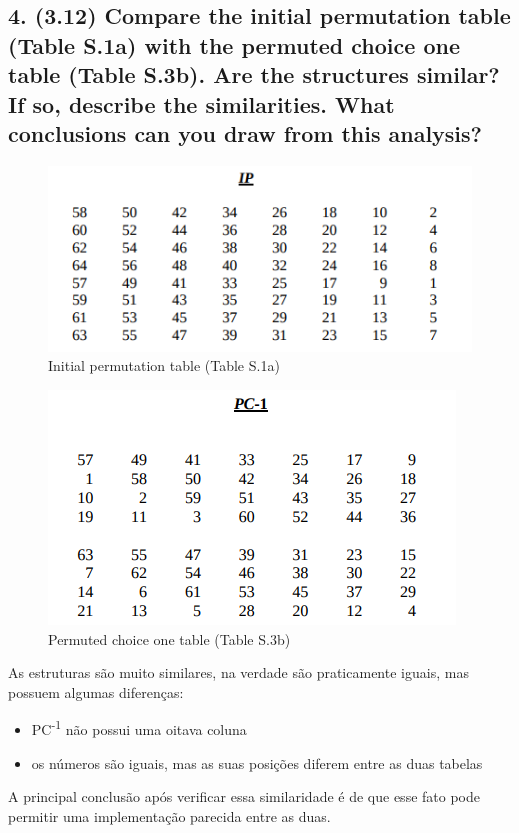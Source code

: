 \documentclass[12pt]{article}
\begin{document}
\subsection*{4. (3.12) Compare the initial permutation table (Table S.1a) with
the permuted choice one table (Table S.3b). Are the structures similar? If so,
describe the similarities. What conclusions can you draw from this analysis?}

  \begin{figure}[h]
    \includegraphics[width=\linewidth]{des_ip}
    \caption{Initial permutation table (Table S.1a)}
  \end{figure}

  \begin{figure}[h]
    \includegraphics[width=\linewidth]{des_pc_1}
    \caption{Permuted choice one table (Table S.3b)}
  \end{figure}

  As estruturas são muito similares, na verdade são praticamente iguais, mas
  possuem algumas diferenças:
  \begin{itemize}
    \item PC\textsuperscript{-1} não possui uma oitava coluna
    \item os números são iguais, mas as suas posições diferem entre as duas
    tabelas
  \end{itemize}
  A principal conclusão após verificar essa similaridade é de que esse fato pode
  permitir uma implementação parecida entre as duas.
\end{document}
